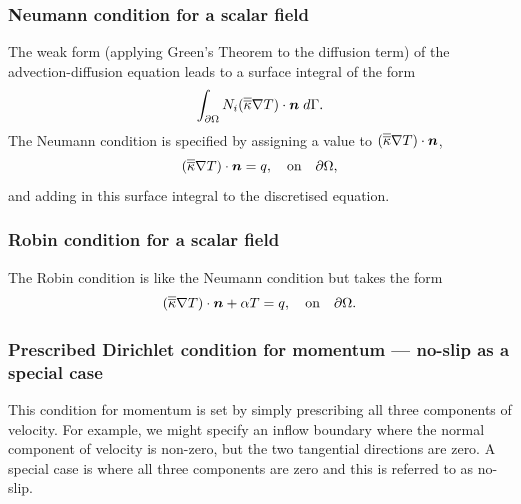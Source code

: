
\subsubsection{Neumann condition for a scalar field}\label{sect:bc_scalar_neumann}
The weak form (applying Green's Theorem to the diffusion term) of the advection-diffusion equation leads to a surface integral of the form
\begin{equation}
\int_{\partial\Omega} N_i (\overline{\overline{\kappa}}\nabla T)\cdot{\mbox{\boldmath$n$}} \;d\Gamma.
\end{equation}
The Neumann condition is specified by assigning a value to $(\overline{\overline{\kappa}}\nabla T)\cdot{\mbox{\boldmath$n$}}$, \eg
\begin{equation}
(\overline{\overline{\kappa}}\nabla T)\cdot{\mbox{\boldmath$n$}} = q,\quad \textrm{on}\quad \partial\Omega,
\end{equation}
and adding in this surface integral to the discretised equation.


\subsubsection{Robin condition for a scalar field}\label{sect:bc_scalar_robin}
The Robin condition is like the Neumann condition but takes the form
\begin{equation}
(\overline{\overline{\kappa}}\nabla T)\cdot{\mbox{\boldmath$n$}} + \alpha T = q,\quad \textrm{on}\quad \partial\Omega.
\end{equation}


\subsubsection{Prescribed Dirichlet condition for momentum --- no-slip as a special case}\label{sect:bc_vector_dirichlet}
This condition for momentum is set by simply prescribing all three components of velocity. For example, we might specify an inflow boundary where the normal component of velocity is non-zero, but the two tangential directions are zero. A special case is where all three components are zero and this is referred to as no-slip.

